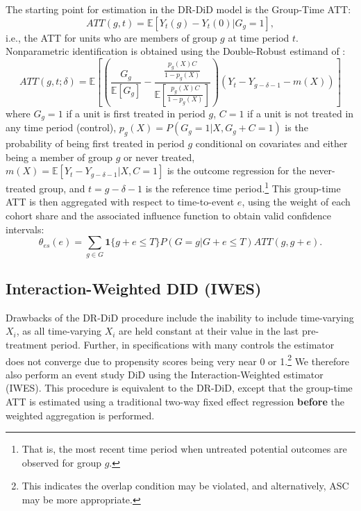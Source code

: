 \documentclass[12pt]{amsart}
\begin{document}
The starting point for estimation in the DR-DiD model is the Group-Time ATT:
\begin{equation}
    ATT(g,t) = \mathbb{E}[Y_t(g) - Y_t(0)| G_g = 1],
\end{equation}
i.e., the ATT for units who are members of group $g$ at time period $t$. Nonparametric identification is obtained using the Double-Robust estimand of :
\begin{equation*}
    ATT(g,t;\delta) = \mathbb{E} \left[\left( 
    \frac{G_g}{\mathbb{E}[G_g]} - \frac{\frac{p_g(X)C}{1-p_g(X)}}{\mathbb{E}\left[\frac{p_g(X)C}{1-p_g(X)}\right]}
    \right) (Y_t - Y_{g-\delta-1} - m(X))
    \right] 
\end{equation*}
where $G_g = 1$ if a unit is first treated in period $g$, $C = 1$ if a unit is not treated in any time period (control), $p_g(X) = P(G_g = 1|X, G_g + C = 1)$ is the probability of being first treated in period $g$ conditional on covariates and either being a member of group $g$ or never treated, $m(X) = \mathbb{E}[Y_t - Y_{g-\delta-1} | X, C=1]$ is the outcome regression for the never-treated group, and $t = g - \delta - 1$ is the reference time period.\footnote{That is, the most recent time period when untreated potential outcomes are observed for group $g$.} This group-time ATT is then aggregated with respect to time-to-event $e$, using the weight of each cohort share and the associated influence function to obtain valid confidence intervals:
\begin{equation}\label{eq:agg}
    \theta_{es}(e) = \sum_{g \in G} {\textbf{1}} \{ g + e \leq T \} P(G = g | G + e \leq T) ATT(g,g+e).
\end{equation}

\subsection{Interaction-Weighted DID (IWES)}

Drawbacks of the DR-DiD procedure include the inability to include time-varying $X_i$, as all time-varying $X_i$ are held constant at their value in the last pre-treatment period. Further, in specifications with many controls the estimator does not converge due to propensity scores being very near 0 or 1.\footnote{This indicates the overlap condition may be violated, and alternatively, ASC may be more appropriate.} We therefore also perform an event study DiD using the  Interaction-Weighted estimator (IWES). This procedure is equivalent to the DR-DiD, except that the group-time ATT is estimated using a traditional two-way fixed effect regression \textbf{before} the weighted aggregation is performed. 
\end{document}
